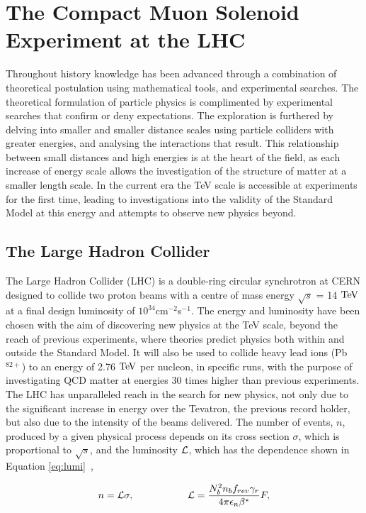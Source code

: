 \chapter{The Compact Muon Solenoid Experiment at the LHC}
\label{ch:detector}

Throughout history knowledge has been advanced through a combination of theoretical postulation using mathematical tools, and experimental searches. The theoretical formulation of particle physics is complimented by experimental searches that confirm or deny expectations. The exploration is furthered by delving into smaller and smaller distance scales using particle colliders with greater energies, and analysing the interactions that result. This relationship between small distances and high energies is at the heart of the field, as each increase of energy scale allows the investigation of the structure of matter at a smaller length scale. In the current era the TeV scale is accessible at experiments for the first time, leading to investigations into the validity of the Standard Model at this energy and attempts to observe new physics beyond. 

\section{The Large Hadron Collider}

The Large Hadron Collider (LHC) is a double-ring circular synchrotron at CERN designed to collide two proton beams with a centre of mass energy $\sqrt{s}$  = 14 $\text{TeV}$ at a final design luminosity of $10^{34}$cm$^{-2}$s$^{-1}$. The energy and luminosity have been chosen with the aim of discovering new physics at the TeV scale, beyond the reach of previous experiments, where theories predict physics both within and outside the Standard Model. It will also be used to collide heavy lead ions (Pb$^{82+}$) to an energy of 2.76 $\text{TeV}$  per nucleon, in specific runs, with the purpose of investigating QCD matter at energies 30 times higher than previous experiments. 
The LHC has unparalleled reach in the search for new physics, not only due to the significant increase in energy over the Tevatron, the previous record holder, but also due to the intensity of the beams delivered. The number of events, $n$, produced by a given physical process depends on its cross section $\sigma$, which is proportional to $\sqrt{s}$, and the luminosity $\mathcal{L}$, which has the dependence shown in Equation \ref{eq:lumi}~\cite{LHCDesign},

\begin{equation}
n = \mathcal{L} \sigma, \hspace{.75in} \mathcal{L} = \frac{N_{b}^{2} n_{b} f_{rev} \gamma_{r}}{4 \pi \epsilon_{n} \beta^{*}}F,
\label{eq:lumi}
\end{equation}

